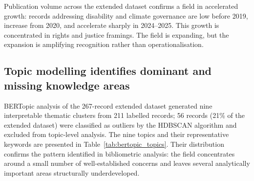 \documentclass[12pt,a4paper]{article}
\begin{document}
Publication volume across the extended dataset confirms a field in accelerated growth: records addressing disability and climate governance are low before 2019, increase from 2020, and accelerate sharply in 2024--2025. This growth is concentrated in rights and justice framings. The field is expanding, but the expansion is amplifying recognition rather than operationalisation.

\subsection*{Topic modelling identifies dominant and missing knowledge areas}

BERTopic analysis of the 267-record extended dataset generated nine interpretable thematic clusters from 211 labelled records; 56 records (21\% of the extended dataset) were classified as outliers by the HDBSCAN algorithm and excluded from topic-level analysis. The nine topics and their representative keywords are presented in Table~\ref{tab:bertopic_topics}. Their distribution confirms the pattern identified in bibliometric analysis: the field concentrates around a small number of well-established concerns and leaves several analytically important areas structurally underdeveloped.
\end{document}
